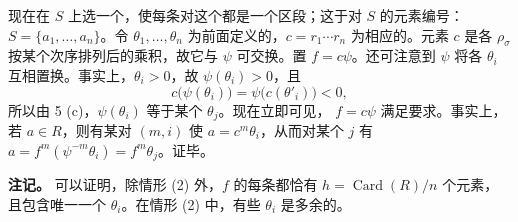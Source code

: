 现在在 $S$ 上选一个，使每条对这个都是一个区段；这于对 $S$ 的元素编号：$S=\{a_1,\ldots,a_n\}$。令 $\theta_1,\ldots,\theta_n$ 为前面定义的，$c=r_1\cdots r_n$ 为相应的。元素 $c$ 是各 $\rho_\sigma$ 按某个次序排列后的乘积，故它与 $\psi$ 可交换。置 $f=c\psi$。还可注意到 $\psi$ 将各 $\theta_i$ 互相置换。事实上，$\theta_i>0$，故 $\psi(\theta_i)>0$，且
\[c\bigl(\psi(\theta_i)\bigr)=\psi\bigl(c(\theta'_i)\bigr)<0,\]
所以由 5 (c)，$\psi(\theta_i)$ 等于某个 $\theta_j$。现在立即可见，
$f=c\psi$ 满足要求。事实上，若 $a\in R$，则有某对 $(m,i)$ 使 $a=c^m\theta_i$，从而对某个 $j$ 有 $a=f^m(\psi^{-m}\theta_i)=f^m\theta_j$。证毕。

\textbf{注记。} 可以证明，除情形 (2) 外，$f$ 的每条都恰有 $h=\operatorname{Card}(R)/n$ 个元素，且包含唯一一个 $\theta_i$。在情形 (2) 中，有些 $\theta_i$ 是多余的。
